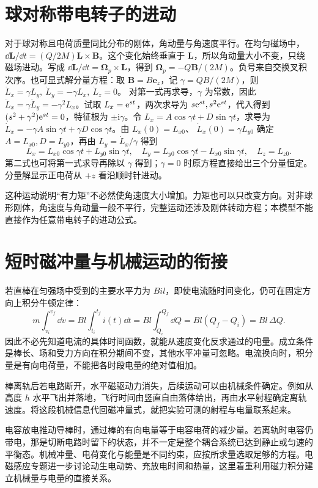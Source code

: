 \section{球对称带电转子的进动}
对于球对称且电荷质量同比分布的刚体，角动量与角速度平行。在均匀磁场中，$\dd\bm L/\dd t=(Q/2M)\bm L\times\bm B$。这个变化始终垂直于 $\bm L$，所以角动量大小不变，只绕磁场进动。写成 $\dd\bm L/\dd t=\bm\Omega_p\times\bm L$，得到 $\bm\Omega_p=-Q\bm B/(2M)$。负号来自交换叉积次序。也可显式解分量方程：取
$\bm B=B\bm e_z$，记 $\gamma=QB/(2M)$，则
$\dot L_x=\gamma L_y,\ \dot L_y=-\gamma L_x,\ \dot L_z=0$。
对第一式再求导，$\gamma$ 为常数，因此 $\ddot L_x=\gamma\dot L_y=-\gamma^2L_x$。试取 $L_x=\mathrm e^{st}$，两次求导为 $s\mathrm e^{st},s^2\mathrm e^{st}$，代入得到 $(s^2+\gamma^2)\mathrm e^{st}=0$，特征根为
$\pm\mathrm i\gamma$。令 $L_x=A\cos\gamma t+D\sin\gamma t$，求导为 $\dot L_x=-\gamma A\sin\gamma t+\gamma D\cos\gamma t$。由 $L_x(0)=L_{x0}$、
$\dot L_x(0)=\gamma L_{y0}$ 确定 $A=L_{x0},D=L_{y0}$，再由 $L_y=\dot L_x/\gamma$ 得到
\[
 L_x=L_{x0}\cos\gamma t+L_{y0}\sin\gamma t,\quad
 L_y=L_{y0}\cos\gamma t-L_{x0}\sin\gamma t,\quad L_z=L_{z0}.
\]
第二式也可将第一式求导再除以 $\gamma$ 得到；$\gamma=0$ 时原方程直接给出三个分量恒定。分量解显示正电荷从 $+z$ 看沿顺时针进动。


这种运动说明“有力矩”不必然使角速度大小增加。力矩也可以只改变方向。对非球形刚体，角速度与角动量一般不平行，完整运动还涉及刚体转动方程；本模型不能直接作为任意带电转子的进动公式。




\section{短时磁冲量与机械运动的衔接}
若直棒在匀强场中受到的主要水平力为 $Bil$，即使电流随时间变化，仍可在固定方向上积分牛顿定律：
\begin{equation}m\int_{v_i}^{v_f}\dd v
=Bl\int_{t_i}^{t_f}i(t)\dd t
=Bl\int_{Q_i}^{Q_f}\dd Q
=Bl(Q_f-Q_i)=Bl\,\Delta Q.\end{equation}
因此不必先知道电流的具体时间函数，就能从速度变化反求通过的电量。成立条件是棒长、场和受力方向在积分期间不变，其他水平冲量可忽略。电流换向时，积分量是有向电荷量，不能把各时段电量的绝对值相加。


棒离轨后若电路断开，水平磁驱动力消失，后续运动可以由机械条件确定。例如从高度 $h$ 水平飞出并落地，飞行时间由竖直自由落体给出，再由水平射程确定离轨速度。将这段机械信息代回磁冲量式，就把实验可测的射程与电量联系起来。


电容放电推动导棒时，通过棒的有向电量等于电容电荷的减少量。若离轨时电容仍带电，那是切断电路时留下的状态，并不一定是整个耦合系统已达到静止或匀速的平衡态。机械冲量、电荷变化与能量是不同约束，应按所求量选取足够的方程。电磁感应专题进一步讨论动生电动势、充放电时间和热量，这里着重利用磁力积分建立机械量与电量的直接关系。


